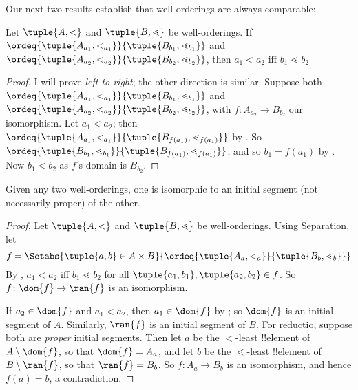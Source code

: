 \documentclass[../../../include/open-logic-section]{subfiles}
\begin{document}
Our next two results establish that well-orderings are always comparable:
\begin{lem}
	Let $\tuple{A, <}$ and $\tuple{B, \lessdot}$ be well-orderings. If $\ordeq{\tuple{A_{a_1}, <_{a_1}}}{\tuple{B_{b_1}, \lessdot_{b_1}}}$ and $\ordeq{\tuple{A_{{a_2}}, <_{a_2}}}{\tuple{B_{{b_2}}, \lessdot_{b_2}}}$, then ${a_1}  < {a_2} \text{ iff }{b_1} \lessdot {b_2}$
\end{lem}
\begin{proof}
	I will prove \emph{left to right}; the other direction is similar.  Suppose both $\ordeq{\tuple{A_{a_1}, <_{a_1}}}{\tuple{B_{b_1}, \lessdot_{b_1}}}$ and $\ordeq{\tuple{A_{{a_2}}, <_{a_2}}}{\tuple{B_{{b_2}}, \lessdot_{b_2}}}$, with $f \colon A_{{a_2}} \to B_{{b_2}}$ our isomorphism. Let ${a_1} < {a_2}$; then $\ordeq{\tuple{A_{a_1}, <_{a_1}}}{\tuple{B_{f({a_1})}, \lessdot_{f({a_1})}}}$ by . So $\ordeq{\tuple{B_{b_1}, \lessdot_{b_1}}}{\tuple{B_{f({a_1})}, \lessdot_{f({a_1})}}}$, and so ${b_1} = f({a_1})$ by . Now ${b_1} \lessdot {b_2}$ as $f$'s domain is $B_{{b_2}}$.	
\end{proof}
\begin{thm}
	Given any two well-orderings, one is isomorphic to an initial segment (not necessarily proper) of the other.
\end{thm}
\begin{proof}
	Let $\tuple{A, <}$ and $\tuple{B, \lessdot}$ be well-orderings. Using Separation, let
	$$f = \Setabs{\tuple{a, b} \in A \times B}{\ordeq{\tuple{A_a, <_a}}{\tuple{B_b, \lessdot_b}}}$$
	By , $a_1 < a_2$ iff $b_1 \lessdot b_2$ for all $\tuple{a_1, b_1}, \tuple{a_2, b_2} \in f$. So $f \colon \dom{f} \to \ran{f}$ is an isomorphism. 
	
	If $a_2 \in \dom{f}$ and $a_1 < a_2$, then $a_1 \in \dom{f}$ by ; so $\dom{f}$ is an initial segment of $A$. Similarly, $\ran{f}$ is an initial segment of $B$. For reductio, suppose both are \emph{proper} initial segments. Then let $a$ be the $<$-least !!{element} of $A \setminus \dom{f}$, so that $\dom{f} = A_a$, and let $b$ be the $\lessdot$-least !!{element} of $B \setminus \ran{f}$, so that $\ran{f} = B_b$. So $f \colon A_a \to B_b$ is an isomorphism, and hence $f(a) = b$, a contradiction.
\end{proof}
\end{document}

